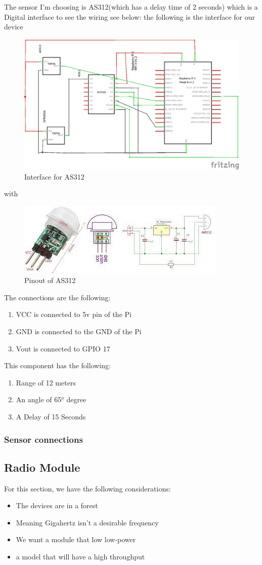 The sensor I'm choosing is AS312\cite{micros}(which has a delay time of 2 seconds) which is a Digital interface to see the wiring see below:
\newpage
the following is the interface for our device

\begin{figure}[h!]
	\begin{center}
		\includegraphics[width=0.5\linewidth]{Images/interfaceofAS312.png}
	\caption{Interface for AS312}
	\label{Interface for AS312}
	\end{center}

\end{figure}
with 
\begin{figure}[h!]
	\centering
	\includegraphics[width=0.5\linewidth]{Images/pinout_of_AS312.jpg}
	\caption*{Pinout of  AS312}
	\label{Pinout of  AS312}
\end{figure}
The connections are the following:
\begin{enumerate}
	\item VCC is connected  to 5v pin of the Pi
	\item GND is connected to the GND of the  Pi
	\item Vout is connected to GPIO 17
\end{enumerate}
This  component has the following:
\begin{enumerate}
	\item Range  of 12 meters 
	\item An  angle  of  65$^o$ degree
	\item A Delay of 15 \mu Seconds
\end{enumerate}
\subsubsection{Sensor connections}

\newpage
\subsection{Radio Module}
For this section, we have the following considerations:
\begin{itemize}
	\item The devices are in a forest
	\item Meaning  Gigahertz  isn't  a desirable frequency
	\item We want a module that low low-power
	\item a model that  will have a high throughput 
\end{itemize}

